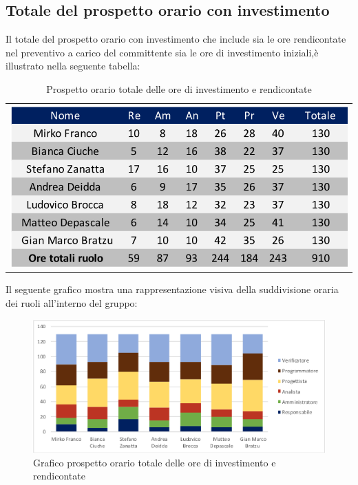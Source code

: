 \subsection{Totale del prospetto orario con investimento}
Il totale del prospetto orario con investimento che include sia le ore rendicontate nel preventivo a carico del committente sia le ore di investimento iniziali,è illustrato nella seguente tabella:

\begin{table}[!ht]
	\begin{center}
		\begin{tabular}{c}
			\includegraphics[scale=0.80]{images/tabellaOreInvestimento.png}
		\end{tabular}
		\caption{Prospetto orario totale delle ore di investimento e rendicontate}
	\end{center}
\end{table}

Il seguente grafico mostra una rappresentazione visiva della suddivisione oraria dei ruoli all'interno del gruppo:
\begin{figure}[!ht]
	\begin{center}
		\includegraphics[scale=0.80]{images/grafoOreInvestimento.png}
		\caption{Grafico prospetto orario totale delle ore di investimento e rendicontate}
	\end{center}
\end{figure}

